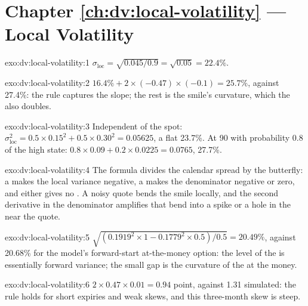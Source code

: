 \section*{Chapter \ref{ch:dv:local-volatility} --- Local Volatility}

\begin{solution}{exo:dv:local-volatility:1}
$\sigma_{\mathrm{loc}}=\sqrt{0.045/0.9}=\sqrt{0.05}=22.4\%$.
\end{solution}

\begin{solution}{exo:dv:local-volatility:2}
$16.4\%+2\times(-0.47)\times(-0.1)=25.7\%$, against 27.4\%: the rule captures the slope; the rest is the
smile's curvature, which the  also doubles.
\end{solution}

\begin{solution}{exo:dv:local-volatility:3}
Independent of the spot: $\sigma_{\mathrm{loc}}^2=0.5\times0.15^2+0.5\times0.30^2=0.05625$, a flat 23.7\%. At 90
with probability 0.8 of the high state: $0.8\times0.09+0.2\times0.0225=0.0765$, 27.7\%.
\end{solution}

\begin{solution}{exo:dv:local-volatility:4}
The formula divides the calendar spread by the butterfly: a  makes the local variance
negative, a  makes the denominator negative or zero, and either gives no .
A noisy quote bends the smile locally, and the second derivative in the denominator amplifies that bend into a
spike or a hole in the  near the quote.
\end{solution}

\begin{solution}{exo:dv:local-volatility:5}
$\sqrt{(0.1919^2\times1-0.1779^2\times0.5)/0.5}=20.49\%$, against 20.68\% for the model's forward-start at-the-money
option: the level of the  is essentially forward variance; the small gap is the curvature of the
 at the money.
\end{solution}

\begin{solution}{exo:dv:local-volatility:6}
$2\times0.47\times0.01=0.94$ point, against 1.31 simulated: the rule holds for short expiries and weak skews, and
this three-month skew is steep.
\end{solution}

